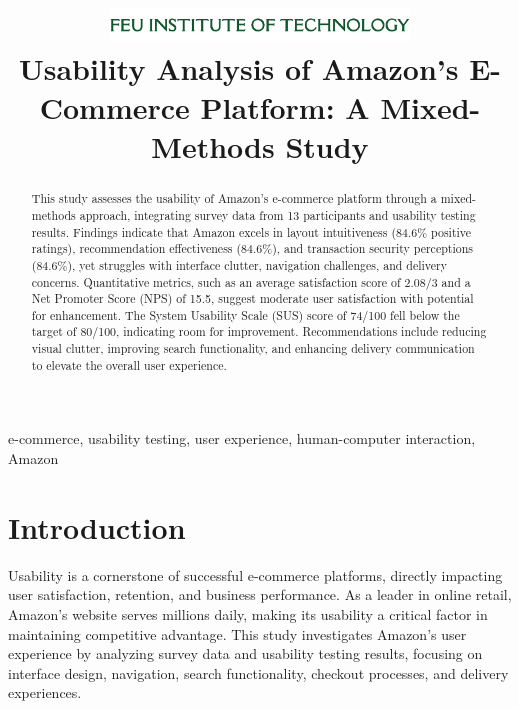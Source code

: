 \documentclass[conference]{IEEEtran}
\begin{document}
\title{\includegraphics[width=0.6\textwidth]{headlogocut.png}\\[1cm]Usability Analysis of Amazon's E-Commerce Platform: A Mixed-Methods Study}

\author{
}

\maketitle

\begin{abstract}
This study assesses the usability of Amazon's e-commerce platform through a mixed-methods approach, integrating survey data from 13 participants and usability testing results. Findings indicate that Amazon excels in layout intuitiveness (84.6\% positive ratings), recommendation effectiveness (84.6\%), and transaction security perceptions (84.6\%), yet struggles with interface clutter, navigation challenges, and delivery concerns. Quantitative metrics, such as an average satisfaction score of 2.08/3 and a Net Promoter Score (NPS) of 15.5, suggest moderate user satisfaction with potential for enhancement. The System Usability Scale (SUS) score of 74/100 fell below the target of 80/100, indicating room for improvement. Recommendations include reducing visual clutter, improving search functionality, and enhancing delivery communication to elevate the overall user experience.
\end{abstract}

\begin{IEEEkeywords}
e-commerce, usability testing, user experience, human-computer interaction, Amazon
\end{IEEEkeywords}

\section{Introduction}
Usability is a cornerstone of successful e-commerce platforms, directly impacting user satisfaction, retention, and business performance. As a leader in online retail, Amazon's website serves millions daily, making its usability a critical factor in maintaining competitive advantage. This study investigates Amazon's user experience by analyzing survey data and usability testing results, focusing on interface design, navigation, search functionality, checkout processes, and delivery experiences.
\end{document}
